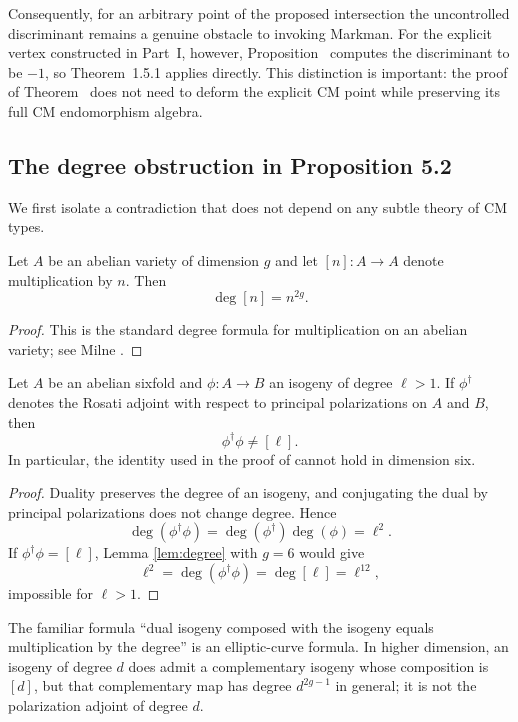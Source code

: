 Consequently, for an arbitrary point of the proposed intersection the uncontrolled discriminant remains a genuine obstacle to invoking Markman.  For the explicit vertex constructed in Part~I, however, Proposition~ computes the discriminant to be $-1$, so Theorem~1.5.1 applies directly.  This distinction is important: the proof of Theorem~ does not need to deform the explicit CM point while preserving its full CM endomorphism algebra.

\subsection{The degree obstruction in Proposition 5.2}
We first isolate a contradiction that does not depend on any subtle theory of CM types.

\begin{lemma}\label{lem:degree}
Let $A$ be an abelian variety of dimension $g$ and let $[n]:A\to A$ denote multiplication by $n$. Then
\[
 \deg[n]=n^{2g}.
\]
\end{lemma}
\begin{proof}
This is the standard degree formula for multiplication on an abelian variety; see Milne \cite[Thm.~7.2]{MilneAV}.
\end{proof}

\begin{proposition}\label{prop:degree-obstruction}
Let $A$ be an abelian sixfold and $\phi:A\to B$ an isogeny of degree $\ell>1$. If $\phi^\dagger$ denotes the Rosati adjoint with respect to principal polarizations on $A$ and $B$, then
\[
 \phi^\dagger\phi\ne[\ell].
\]
In particular, the identity used in the proof of \cite[Prop.~5.2]{Mostaed2026} cannot hold in dimension six.
\end{proposition}
\begin{proof}
Duality preserves the degree of an isogeny, and conjugating the dual by principal polarizations does not change degree. Hence
\[
 \deg(\phi^\dagger\phi)=\deg(\phi^\dagger)\deg(\phi)=\ell^2.
\]
If $\phi^\dagger\phi=[\ell]$, Lemma \ref{lem:degree} with $g=6$ would give
\[
 \ell^2=\deg(\phi^\dagger\phi)=\deg[\ell]=\ell^{12},
\]
impossible for $\ell>1$.
\end{proof}

\begin{remark}
The familiar formula ``dual isogeny composed with the isogeny equals multiplication by the degree'' is an elliptic-curve formula. In higher dimension, an isogeny of degree $d$ does admit a complementary isogeny whose composition is $[d]$, but that complementary map has degree $d^{2g-1}$ in general; it is not the polarization adjoint of degree $d$.
\end{remark}

